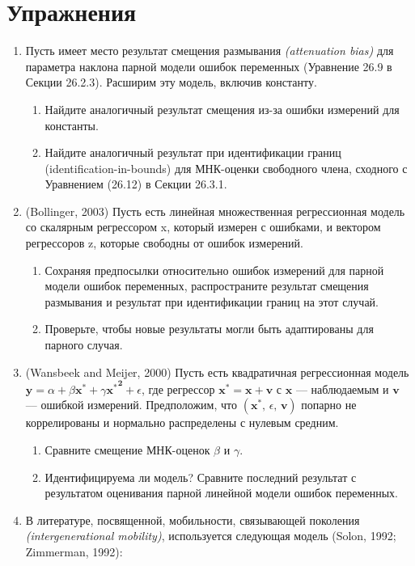 \section*{Упражнения} 
\begin{enumerate}
\item Пусть имеет место результат смещения размывания \emph{(attenuation bias)} для параметра наклона парной модели ошибок переменных (Уравнение 26.9 в Секции 26.2.3). Расширим эту модель, включив константу.
\begin{enumerate}
\item Найдите аналогичный результат  смещения из-за ошибки измерений для константы.
\item	Найдите аналогичный результат при идентификации границ (identification-in-bounds) для МНК-оценки свободного члена, сходного с Уравнением (26.12) в Секции 26.3.1.
\end{enumerate}
\item (Bollinger, 2003) Пусть есть линейная множественная регрессионная модель со скалярным регрессором x, который измерен с ошибками, и вектором регрессоров z, которые свободны от ошибок измерений.
\begin{enumerate}
\item Сохраняя предпосылки относительно ошибок измерений для парной модели ошибок переменных, распространите результат смещения размывания и результат при идентификации границ на этот случай.
\item Проверьте, чтобы новые результаты могли быть адаптированы для парного случая.
\end{enumerate}
\item (Wansbeek and Meijer, 2000) Пусть есть квадратичная регрессионная модель $\mathbf{y}=\alpha + \beta\mathbf{x^*}+\gamma\mathbf{{x^*}^2}+\epsilon$, где регрессор $\mathbf{x^*}=\mathbf{x}+\mathbf{v}$ с $\mathbf{x}$ --– наблюдаемым и $\mathbf{v}$ --– ошибкой измерений. Предположим, что $(\mathbf
x^*, \, \epsilon, \, \mathbf{v})$ попарно не коррелированы и нормально распределены с нулевым средним.
\begin{enumerate}
\item	Сравните смещение МНК-оценок $\beta$ и $\gamma$.
\item	Идентифицируема ли модель? Сравните последний результат с результатом оценивания парной линейной модели ошибок переменных.
\end{enumerate}
\item В литературе, посвященной, мобильности, связывающей поколения \emph{(intergenerational mobility)}, используется следующая модель (Solon, 1992; Zimmerman, 1992):

\end{enumerate}

